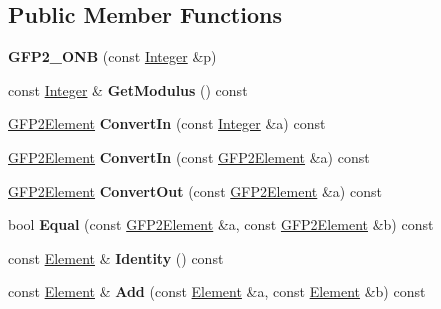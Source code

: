 \subsection*{Public Member Functions}
\begin{DoxyCompactItemize}
\item 
\hypertarget{class_g_f_p2___o_n_b_a29804cd3d3063af5411b87683eaccbdc}{
{\bfseries GFP2\_\-ONB} (const \hyperlink{class_integer}{Integer} \&p)}
\label{class_g_f_p2___o_n_b_a29804cd3d3063af5411b87683eaccbdc}

\item 
\hypertarget{class_g_f_p2___o_n_b_aea733cd165e1c63b5f15a8530d5d4e81}{
const \hyperlink{class_integer}{Integer} \& {\bfseries GetModulus} () const }
\label{class_g_f_p2___o_n_b_aea733cd165e1c63b5f15a8530d5d4e81}

\item 
\hypertarget{class_g_f_p2___o_n_b_a39b2b3a19f057b43e44159d3ca477861}{
\hyperlink{class_g_f_p2_element}{GFP2Element} {\bfseries ConvertIn} (const \hyperlink{class_integer}{Integer} \&a) const }
\label{class_g_f_p2___o_n_b_a39b2b3a19f057b43e44159d3ca477861}

\item 
\hypertarget{class_g_f_p2___o_n_b_a5969dd8c756805ff47f7fdeaa4c7205f}{
\hyperlink{class_g_f_p2_element}{GFP2Element} {\bfseries ConvertIn} (const \hyperlink{class_g_f_p2_element}{GFP2Element} \&a) const }
\label{class_g_f_p2___o_n_b_a5969dd8c756805ff47f7fdeaa4c7205f}

\item 
\hypertarget{class_g_f_p2___o_n_b_a5b3e339ae0781608ff4e53d8b2808cd2}{
\hyperlink{class_g_f_p2_element}{GFP2Element} {\bfseries ConvertOut} (const \hyperlink{class_g_f_p2_element}{GFP2Element} \&a) const }
\label{class_g_f_p2___o_n_b_a5b3e339ae0781608ff4e53d8b2808cd2}

\item 
\hypertarget{class_g_f_p2___o_n_b_ac8800fcda3f15373fd4bf8ae2bcfd0aa}{
bool {\bfseries Equal} (const \hyperlink{class_g_f_p2_element}{GFP2Element} \&a, const \hyperlink{class_g_f_p2_element}{GFP2Element} \&b) const }
\label{class_g_f_p2___o_n_b_ac8800fcda3f15373fd4bf8ae2bcfd0aa}

\item 
\hypertarget{class_g_f_p2___o_n_b_ab5ed829664633436cf51be2a1ec66c5d}{
const \hyperlink{class_g_f_p2_element}{Element} \& {\bfseries Identity} () const }
\label{class_g_f_p2___o_n_b_ab5ed829664633436cf51be2a1ec66c5d}

\item 
\hypertarget{class_g_f_p2___o_n_b_a747b4e6bd732d5629dcc265b38bb1bce}{
const \hyperlink{class_g_f_p2_element}{Element} \& {\bfseries Add} (const \hyperlink{class_g_f_p2_element}{Element} \&a, const \hyperlink{class_g_f_p2_element}{Element} \&b) const }
\label{class_g_f_p2___o_n_b_a747b4e6bd732d5629dcc265b38bb1bce}


\end{DoxyCompactItemize}
